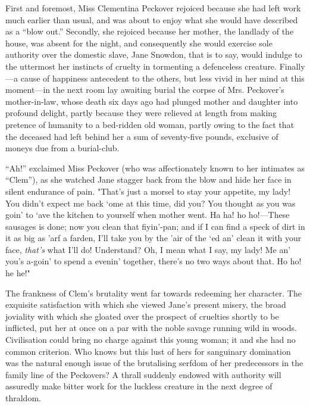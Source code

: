 First and foremost, Miss Clementina Peckover rejoiced because she had
left work much earlier than usual, and was about to enjoy what she would
have described as a ``blow out.'' Secondly, she rejoiced because her
mother, the landlady of the house, was absent for the night, and
consequently she would exercise sole authority over the domestic slave,
Jane Snowdon, that is to say, would indulge to the uttermost her
instincts of cruelty in tormenting a defenceless creature. Finally---a
cause of happiness antecedent to {}the others, but less vivid in her
mind at this moment---in the next room lay awaiting burial the corpse of
Mrs. Peckover's mother-in-law, whose death six days ago had plunged
mother and daughter into profound delight, partly because they were
relieved at length from making pretence of humanity to a bed-ridden old
woman, partly owing to the fact that the deceased had left behind her a
sum of seventy-five pounds, exclusive of moneys due from a burial-club.

``Ah!'' exclaimed Miss Peckover (who was affectionately known to her
intimates as ``Clem''), as she watched Jane stagger back from the blow
and hide her face in silent endurance of pain. "That's just a morsel to
stay your appetite, my lady! You didn't expect me back `ome at this
time, did you? You thought as you was goin' to `ave the kitchen to
yourself when mother went. Ha ha! ho ho!---These sausages is done; now
you clean that fiyin'-pan; and if I can find a speck of dirt in it as
big as 'arf a farden, I'll take you by the 'air of {}the `ed an' clean
it with your face, \emph{that's} what I'll do! Understand? Oh, I mean
what I say, my lady! Me an' you's a-goin' to spend a evenin' together,
there's no two ways about that. Ho ho! he he!"

The frankness of Clem's brutality went far towards redeeming her
character. The exquisite satisfaction with which she viewed Jane's
present misery, the broad joviality with which she gloated over the
prospect of cruelties shortly to be inflicted, put her at once on a par
with the noble savage running wild in woods. Civilisation could bring no
charge against this young woman; it and she had no common criterion. Who
knows but this lust of hers for sanguinary domination was the natural
enough issue of the brutalising serfdom of her predecessors in the
family line of the Peckovers? A thrall suddenly endowed with authority
will assuredly make bitter work for the luckless creature in the next
degree of thraldom.

